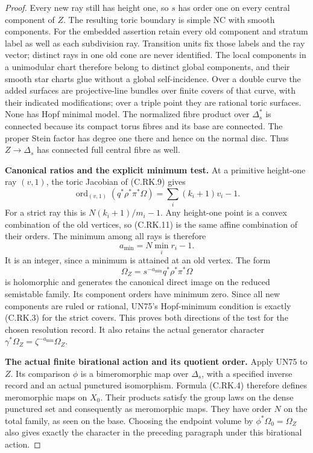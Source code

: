\begin{proof}
Every new ray still has height one,
so $s$ has order one on every central
component of $Z$. The resulting toric
boundary is simple NC with smooth
components. For the embedded assertion
retain every old component and stratum
label as well as each subdivision ray.
Transition units fix those labels and
the ray vector; distinct rays in one
old cone are never identified. The
local components in a unimodular
chart therefore belong to distinct
global components, and their smooth
star charts glue without a global
self-incidence. Over a double curve the
added surfaces are projective-line
bundles over finite covers of that
curve, with their indicated modifications;
over a triple point they are rational
toric surfaces. None has Hopf minimal
model. The normalized fibre product
over $\Delta_s^*$ is connected because
its compact torus fibres and its base
are connected. The proper Stein factor
has degree one there and hence on the
normal disc. Thus $Z\to\Delta_s$ has
connected full central fibre as well.

\par\medskip\noindent\textbf{Canonical ratios and the explicit minimum test.}
At a primitive height-one ray $(v,1)$,
the toric Jacobian of (C.RK.9) gives
\[
 \operatorname{ord}_{(v,1)}(q^*\rho^*\pi^*\Omega)
                 =\sum_i(k_i+1)v_i-1.
\tag{C.RK.11}
\]
For a strict ray this is
$N(k_i+1)/m_i-1$. Any height-one
point is a convex combination of the
old vertices, so (C.RK.11) is the
same affine combination of their
orders. The minimum among all rays is
therefore
\[
                  a_{\min}=N\min_i r_i-1.
\tag{C.RK.12}
\]
It is an integer, since a minimum is
attained at an old vertex. The form
\[
            \Omega_Z=s^{-a_{\min}}
                             q^*\rho^*\pi^*\Omega
\tag{C.RK.13}
\]
is holomorphic and generates the
canonical direct image on the reduced
semistable family. Its component
orders have minimum zero. Since all
new components are ruled or rational,
UN75's Hopf-minimum condition is
exactly (C.RK.3) for the strict covers.
This proves both directions of the
test for the chosen resolution record.
It also retains the actual generator
character
$\gamma^*\Omega_Z=\zeta^{-a_{\min}}\Omega_Z$.

\par\medskip\noindent\textbf{The actual finite birational action and its quotient order.}
Apply UN75 to $Z$. Its comparison
$\phi$ is a bimeromorphic map over
$\Delta_s$, with a specified inverse
record and an actual punctured
isomorphism. Formula (C.RK.4)
therefore defines meromorphic maps
on $X_0$. Their products satisfy
the group laws on the dense
punctured set and consequently
as meromorphic maps. They have
order $N$ on the total family,
as seen on the base. Choosing
the endpoint volume by
$\phi^*\Omega_0=\Omega_Z$ also
gives exactly the character in
the preceding paragraph under
this birational action.


\end{proof}
